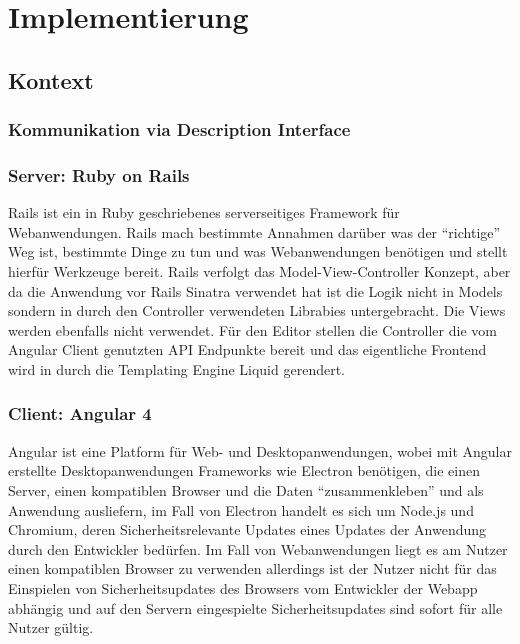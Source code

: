 \section{Implementierung}
\label{sec:implementation-analysis}

\subsection{Kontext}



\subsubsection{Kommunikation via Description Interface}



\subsubsection{Server: Ruby on Rails}

Rails ist ein in Ruby geschriebenes serverseitiges Framework für
Webanwendungen. Rails mach bestimmte Annahmen darüber was der ``richtige'' Weg
ist, bestimmte Dinge zu tun und was Webanwendungen benötigen und stellt hierfür
Werkzeuge bereit. Rails verfolgt das Model-View-Controller Konzept, aber da die
Anwendung vor Rails Sinatra verwendet hat ist die Logik nicht in Models sondern
in durch den Controller verwendeten Librabies untergebracht. Die Views werden
ebenfalls nicht verwendet. Für den Editor stellen die Controller die vom Angular
Client genutzten API Endpunkte bereit und das eigentliche Frontend wird in durch
die Templating Engine Liquid gerendert.

\subsubsection{Client: Angular 4}

Angular ist eine Platform für Web- und Desktopanwendungen, wobei mit Angular
erstellte Desktopanwendungen Frameworks wie Electron benötigen, die einen
Server, einen kompatiblen Browser und die Daten ``zusammenkleben'' und als
Anwendung ausliefern, im Fall von Electron handelt es sich um Node.js und
Chromium, deren Sicherheitsrelevante Updates eines Updates der Anwendung durch
den Entwickler bedürfen. Im Fall von Webanwendungen liegt es am Nutzer einen
kompatiblen Browser zu verwenden allerdings ist der Nutzer nicht für das
Einspielen von Sicherheitsupdates des Browsers vom Entwickler der Webapp
abhängig und auf den Servern eingespielte Sicherheitsupdates sind sofort für
alle Nutzer gültig.

